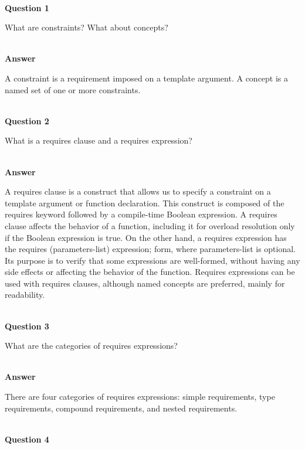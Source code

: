 \hspace*{\fill} \\ %
\noindent
\textbf{Question 1}

What are constraints? What about concepts?

\hspace*{\fill} \\ %
\noindent
\textbf{Answer}

A constraint is a requirement imposed on a template argument. A concept is a named set of one or more constraints.


\hspace*{\fill} \\ %
\noindent
\textbf{Question 2}

What is a requires clause and a requires expression?

\hspace*{\fill} \\ %
\noindent
\textbf{Answer}

A requires clause is a construct that allows us to specify a constraint on a template argument or function declaration. This construct is composed of the requires keyword followed by a compile-time Boolean expression. A requires clause affects the behavior of a function, including it for overload resolution only if the Boolean expression is true. On the other hand, a requires expression has the requires (parameters-list) expression; form, where parameters-list is optional. Its purpose is to verify that some expressions are well-formed, without having any side effects or affecting the behavior of the function. Requires expressions can be used with requires clauses, although named concepts are preferred, mainly for readability.

\hspace*{\fill} \\ %
\noindent
\textbf{Question 3}

What are the categories of requires expressions?

\hspace*{\fill} \\ %
\noindent
\textbf{Answer}

There are four categories of requires expressions: simple requirements, type requirements, compound requirements, and nested requirements.

\hspace*{\fill} \\ %
\noindent
\textbf{Question 4}

